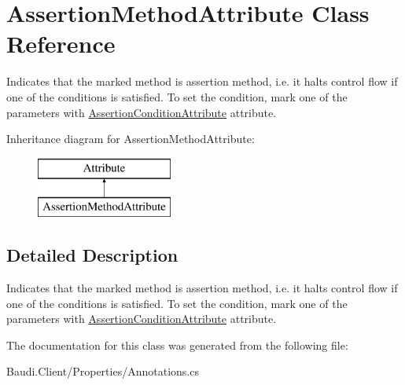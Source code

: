 \hypertarget{class_assertion_method_attribute}{}\section{Assertion\+Method\+Attribute Class Reference}
\label{class_assertion_method_attribute}


Indicates that the marked method is assertion method, i.\+e. it halts control flow if one of the conditions is satisfied. To set the condition, mark one of the parameters with \hyperlink{class_assertion_condition_attribute}{Assertion\+Condition\+Attribute} attribute.  


Inheritance diagram for Assertion\+Method\+Attribute\+:\begin{figure}[H]
\begin{center}
\leavevmode
\includegraphics[height=2.000000cm]{class_assertion_method_attribute}
\end{center}
\end{figure}


\subsection{Detailed Description}
Indicates that the marked method is assertion method, i.\+e. it halts control flow if one of the conditions is satisfied. To set the condition, mark one of the parameters with \hyperlink{class_assertion_condition_attribute}{Assertion\+Condition\+Attribute} attribute. 



The documentation for this class was generated from the following file\+:\begin{DoxyCompactItemize}
\item 
Baudi.\+Client/\+Properties/Annotations.\+cs\end{DoxyCompactItemize}
